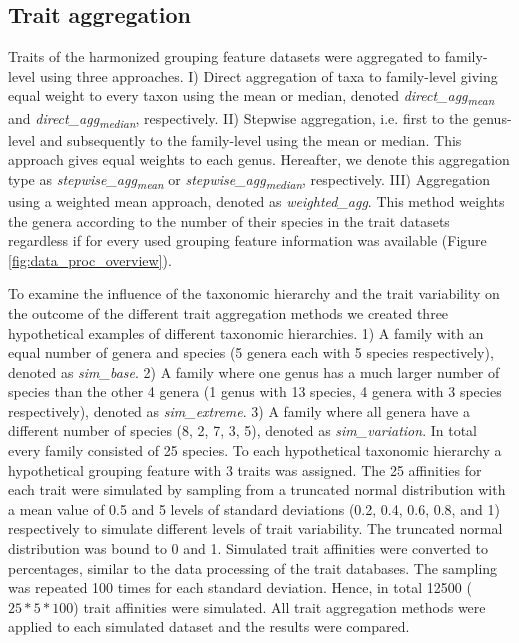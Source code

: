\documentclass{article}
\begin{document}
\newpage

\subsection*{Trait aggregation}

Traits of the harmonized grouping feature datasets were aggregated to family-level using three approaches. I) Direct aggregation of taxa to family-level giving equal weight to every taxon using the mean or median, denoted \textit{direct\_agg\textsubscript{mean}} and \textit{direct\_agg\textsubscript{median}}, respectively. II) Stepwise aggregation, i.e. first to the genus-level and subsequently to the family-level using the mean or median. This approach gives equal weights to each genus. Hereafter, we denote this aggregation type as \textit{stepwise\_agg\textsubscript{mean}} or \textit{stepwise\_agg\textsubscript{median}}, respectively. III) Aggregation using a weighted mean approach, denoted as \textit{weighted\_agg}. This method weights the genera according to the number of their species in the trait datasets regardless if for every used grouping feature information was available (Figure \ref{fig:data_proc_overview}). 

To examine the influence of the taxonomic hierarchy and the trait variability on the outcome of the different trait aggregation methods we created three hypothetical examples of different taxonomic hierarchies. 
1) A family with an equal number of genera and species (5 genera each with 5 species respectively), denoted as \textit{sim\_base}.
2) A family where one genus has a much larger number of species than the other 4 genera (1 genus with 13 species, 4 genera with 3 species respectively), denoted as \textit{sim\_extreme}. 
3) A family where all genera have a different number of species (8, 2, 7, 3, 5), denoted as \textit{sim\_variation}. In total every family consisted of 25 species. To each hypothetical taxonomic hierarchy a hypothetical grouping feature with 3 traits was assigned. The 25 affinities for each trait were simulated by sampling from a truncated normal distribution with a mean value of 0.5 and 5 levels of standard deviations (0.2, 0.4, 0.6, 0.8, and 1) respectively to simulate different levels of trait variability. The truncated normal distribution was bound to 0 and 1. Simulated trait affinities were converted to percentages, similar to the data processing of the trait databases. The sampling was repeated 100 times for each standard deviation. Hence, in total 12500 ($25 * 5 * 100$) trait affinities were simulated. All trait aggregation methods were applied to each simulated dataset and the results were compared.   
\end{document}

